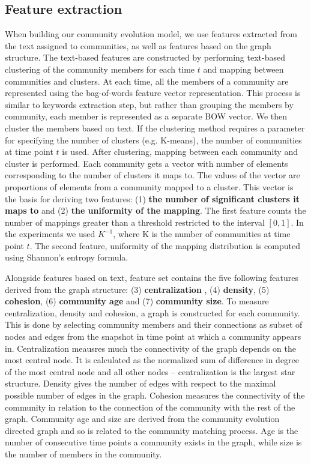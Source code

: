 \documentclass{article} %
\begin{document}
\subsection{Feature extraction}
When building our community evolution model, we use features extracted from the text assigned to communities, as well as features based on  the graph structure. The text-based features are constructed by performing text-based clustering of the community members for each time $t$ and mapping between communities and clusters. At each time,  all the members of a  community are represented using the bag-of-words feature vector representation. This process is similar to keywords extraction step, but rather than grouping the members by community, each member is represented as a separate BOW vector.  We then cluster the members based on text. If the clustering method requires a parameter for specifying the number of clusters (e.g. K-means), the number of communities at time point $t$ is used. After clustering, mapping between each community and cluster is performed. Each community gets a vector with number of elements corresponding to the number of clusters it maps to. The values of the vector are proportions of elements from a community mapped to a cluster. This vector is the basis for deriving two features: (1) {\bf the number of significant clusters it maps to} and (2) { \bf the uniformity of the mapping}. The first feature counts the number of mappings greater than a threshold restricted to the interval $[0, 1]$. In the experiments we used $K^{-1}$, where K is  the number of communities at time point $t$. The second feature, uniformity of the mapping distribution is computed using Shannon's entropy formula.

Alongside features based on text, feature set contains the five following features derived from the graph structure: (3) {\bf centralization} \cite{freeman1978}, (4) {\bf density}\cite{wasserman1994}, (5) {\bf cohesion}, (6) {\bf community age} and (7) {\bf community size}. To measure centralization, density and cohesion, a graph is constructed for each community. This is done by selecting community members and their connections as subset of nodes and edges from the snapshot in time point at which a community appears in. Centralization meausres much the connectivity of the graph depends on the most central node. It is calculated as the normalized  sum of difference in degree of the most central node and all other nodes -- centralization is the largest star structure. Density gives the number of edges with respect to  the maximal possible number of edges in the graph. Cohesion measures the connectivity of the community in relation to the connection of the community with the rest of the graph. Community age and size are derived from the community evolution directed graph and so is related to the community matching process. Age is the number of consecutive time points a community exists in the graph, while size is the number of members in the community.
\end{document}
